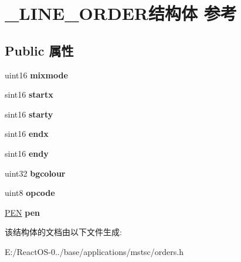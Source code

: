 \hypertarget{struct___l_i_n_e___o_r_d_e_r}{}\section{\+\_\+\+L\+I\+N\+E\+\_\+\+O\+R\+D\+E\+R结构体 参考}
\label{struct___l_i_n_e___o_r_d_e_r}
\subsection*{Public 属性}
\begin{DoxyCompactItemize}
\item 
\mbox{\label{struct___l_i_n_e___o_r_d_e_r_a25019b0dd24f08e42917ea6127793d68}} 
uint16 {\bfseries mixmode}
\item 
\mbox{\label{struct___l_i_n_e___o_r_d_e_r_a27faa24663517d1a8c693a80d6afe9c0}} 
sint16 {\bfseries startx}
\item 
\mbox{\label{struct___l_i_n_e___o_r_d_e_r_ae520b40cf8451788a4d705ee8c354365}} 
sint16 {\bfseries starty}
\item 
\mbox{\label{struct___l_i_n_e___o_r_d_e_r_ae23d4c2770dd5e79238b089739c7fa30}} 
sint16 {\bfseries endx}
\item 
\mbox{\label{struct___l_i_n_e___o_r_d_e_r_a5f71f2cc16c73cca80dbc2b6baebbc13}} 
sint16 {\bfseries endy}
\item 
\mbox{\label{struct___l_i_n_e___o_r_d_e_r_af2508d492413db8e7f4773f88db2a603}} 
uint32 {\bfseries bgcolour}
\item 
\mbox{\label{struct___l_i_n_e___o_r_d_e_r_a026575d3cbca00a906bb3f36dc48ea47}} 
uint8 {\bfseries opcode}
\item 
\mbox{\label{struct___l_i_n_e___o_r_d_e_r_a3e8d8899175a428241b410d606564bf7}} 
\hyperlink{struct___p_e_n}{P\+EN} {\bfseries pen}
\end{DoxyCompactItemize}


该结构体的文档由以下文件生成\+:\begin{DoxyCompactItemize}
\item 
E\+:/\+React\+O\+S-\/0../base/applications/mstsc/orders.\+h\end{DoxyCompactItemize}
